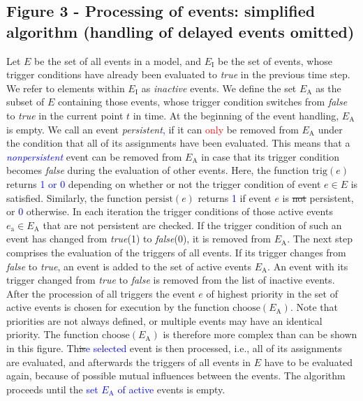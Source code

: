 \documentclass[10pt]{bmc_article}
\newenvironment{bmcformat}{\fussy\setboolean{publ}{true}}{\fussy}
\newcommand{\COR}[1]                      {\textcolor{blue}{#1}}
\newcommand{\true}                        {\emph{true}\xspace}
\newcommand{\TODO}[1]                     {\textcolor{red}{#1}}
\newcommand{\false}                       {\emph{false}\xspace}
\begin{document}
\begin{bmcformat}
\subsection*{Figure 3 - Processing of events: simplified algorithm (handling of delayed events omitted)}
Let $E$ be the set of all events in a model, and $E_\mathrm{I}$ be the set of events, whose trigger
conditions have already been evaluated to \true in the previous time step. We refer to elements within
$E_\mathrm{I}$ as \emph{inactive} events. We define the set $E_\mathrm{A}$ as the subset of $E$ containing those events,
whose trigger condition switches from \false to \true in the current point $t$ in time. At the beginning
of the event handling, $E_\mathrm{A}$ is empty. We call an event \emph{persistent}\COR{,} if it can \TODO{only} be removed from $E_\mathrm{A}$ under the condition that all of its assignments have been evaluated. This means that a
\COR{\emph{nonpersistent}} event can be removed from $E_\mathrm{A}$ in case that its trigger condition becomes \false during the evaluation of other events. Here, the function $\mathrm{trig}(e)$ returns \COR{1 or 0} depending on whether or not the trigger condition of event $e \in E$ is satisfied. Similarly, the function
$\mathrm{persist}(e)$ returns \COR{1} if event $e$ is \sout{not} persistent, or \COR{0} otherwise.
In each iteration the trigger conditions of those active events $e_\mathrm{a} \in E_\mathrm{A}$ that are not persistent are checked.
If the trigger condition of such an event has changed from \true (1) to \false (0), it is removed from $E_\mathrm{A}$.
The next step comprises the evaluation of the triggers of all events.
If its trigger changes from \false to \true, an event is added to the set of active events $E_\mathrm{A}$.
An event with its trigger changed from \true to \false is removed from the list of inactive events.
After the procession of all triggers the event $e$ of highest priority in the set of active events is chosen for execution by the function $\mathrm{choose}(E_\mathrm{A})$.
Note that priorities are not always defined, or multiple events may have an identical priority. The function $\mathrm{choose}(E_\mathrm{A})$ is therefore more complex than can be shown in this figure.
Th\sout{is}\COR{e selected} event is then processed, i.e., all of its assignments are evaluated, and afterwards the triggers of all events in $E$ have to be evaluated again, because of possible mutual influences between the events.
The algorithm proceeds until the \COR{set $E_\mathrm{A}$ of active} events is empty.


\end{bmcformat}
\end{document}
